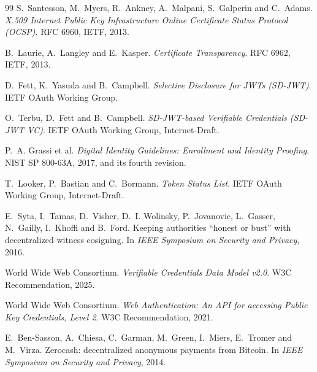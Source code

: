 \begin{thebibliography}{99}
 S.~Santesson, M.~Myers, R.~Ankney, A.~Malpani, S.~Galperin and C.~Adams.
  \emph{X.509 Internet Public Key Infrastructure Online Certificate Status Protocol (OCSP)}.
  RFC 6960, IETF, 2013.

 B.~Laurie, A.~Langley and E.~Kasper. \emph{Certificate Transparency}. RFC 6962,
  IETF, 2013.

 D.~Fett, K.~Yasuda and B.~Campbell. \emph{Selective Disclosure for JWTs (SD-JWT)}.
  IETF OAuth Working Group.

 O.~Terbu, D.~Fett and B.~Campbell. \emph{SD-JWT-based Verifiable Credentials
  (SD-JWT VC)}. IETF OAuth Working Group, Internet-Draft.

 P.~A. Grassi et al. \emph{Digital Identity Guidelines: Enrollment and Identity
  Proofing}. NIST SP 800-63A, 2017, and its fourth revision.

 T.~Looker, P.~Bastian and C.~Bormann. \emph{Token Status List}. IETF OAuth
  Working Group, Internet-Draft.

 E.~Syta, I.~Tamas, D.~Visher, D.~I. Wolinsky, P.~Jovanovic, L.~Gasser,
  N.~Gailly, I.~Khoffi and B.~Ford. Keeping authorities ``honest or bust'' with decentralized
  witness cosigning. In \emph{IEEE Symposium on Security and Privacy}, 2016.

 World Wide Web Consortium. \emph{Verifiable Credentials Data Model v2.0}. W3C
  Recommendation, 2025.

 World Wide Web Consortium. \emph{Web Authentication: An API for accessing
  Public Key Credentials, Level 2}. W3C Recommendation, 2021.

 E.~Ben-Sasson, A.~Chiesa, C.~Garman, M.~Green, I.~Miers, E.~Tromer and
  M.~Virza. Zerocash: decentralized anonymous payments from Bitcoin. In \emph{IEEE Symposium on
  Security and Privacy}, 2014.

\end{thebibliography}
